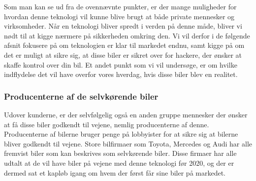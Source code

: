 Som man kan se ud fra de ovennævnte punkter, er der mange muligheder for hvordan denne teknologi vil kunne blive brugt at både private mennesker og virksomheder. Når en teknologi bliver spredt i verden på denne måde, bliver vi nødt til at kigge nærmere på sikkerheden omkring den. Vi vil derfor i de følgende afsnit fokusere på om teknologien er klar til markedet endnu, samt kigge på om det er muligt at sikre sig, at disse biler er sikret over for hackere, der ønsker at skaffe kontrol over din bil. Et andet punkt som vi vil undersøge, er om hvilke indflydelse det vil have overfor vores hverdag, hvis disse biler blev en realitet.

\subsubsection{Producenterne af de selvkørende biler}
Udover kunderne, er der selvfølgelig også en anden gruppe mennesker der ønsker at få disse biler godkendt til vejene, nemlig producenterne af denne. Producenterne af bilerne bruger penge på lobbyister for at sikre sig at bilerne bliver godkendt til vejene\cite{soprweb}. Store bilfirmaer som Toyota, Mercedes og Audi har alle fremvist biler \cite{PopularMechanics} som kan beskrives som selvkørende biler. Disse firmaer har alle udtalt at de vil have biler på vejene med denne teknologi før 2020, og der er dermed sat et kapløb igang om hvem der først får sine biler på markedet. 